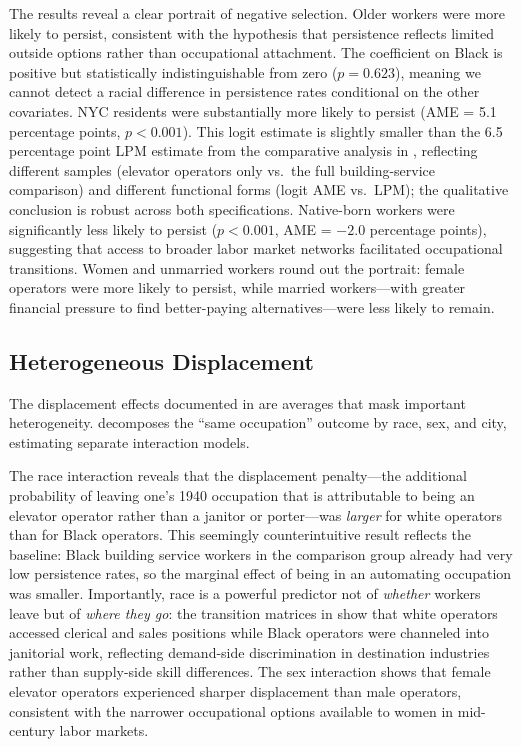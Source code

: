 \documentclass[12pt]{article}
\begin{document}
The results reveal a clear portrait of negative selection. Older workers were more likely to persist, consistent with the hypothesis that persistence reflects limited outside options rather than occupational attachment. The coefficient on Black is positive but statistically indistinguishable from zero ($p = 0.623$), meaning we cannot detect a racial difference in persistence rates conditional on the other covariates. NYC residents were substantially more likely to persist (AME = 5.1 percentage points, $p < 0.001$). This logit estimate is slightly smaller than the 6.5 percentage point LPM estimate from the comparative analysis in , reflecting different samples (elevator operators only vs.\ the full building-service comparison) and different functional forms (logit AME vs.\ LPM); the qualitative conclusion is robust across both specifications. Native-born workers were significantly less likely to persist ($p < 0.001$, AME = $-2.0$ percentage points), suggesting that access to broader labor market networks facilitated occupational transitions. Women and unmarried workers round out the portrait: female operators were more likely to persist, while married workers---with greater financial pressure to find better-paying alternatives---were less likely to remain.

\subsection{Heterogeneous Displacement}

The displacement effects documented in  are averages that mask important heterogeneity.  decomposes the ``same occupation'' outcome by race, sex, and city, estimating separate interaction models.



The race interaction reveals that the displacement penalty---the additional probability of leaving one's 1940 occupation that is attributable to being an elevator operator rather than a janitor or porter---was \emph{larger} for white operators than for Black operators. This seemingly counterintuitive result reflects the baseline: Black building service workers in the comparison group already had very low persistence rates, so the marginal effect of being in an automating occupation was smaller. Importantly, race is a powerful predictor not of \emph{whether} workers leave but of \emph{where they go}: the transition matrices in  show that white operators accessed clerical and sales positions while Black operators were channeled into janitorial work, reflecting demand-side discrimination in destination industries rather than supply-side skill differences. The sex interaction shows that female elevator operators experienced sharper displacement than male operators, consistent with the narrower occupational options available to women in mid-century labor markets.
\end{document}
